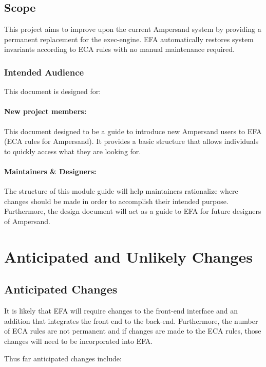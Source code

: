 \documentclass[12pt]{article}
\begin{document}
\subsection{Scope}
This project aims to improve upon the current Ampersand system by providing a 
permanent replacement for the exec-engine. EFA automatically restores system 
invariants according to ECA rules with no manual maintenance required.

\subsubsection{Intended Audience}
This document is designed for:
\paragraph{New project members:}
This document designed to be a guide to introduce new Ampersand users to EFA 
(ECA rules for Ampersand). It provides a basic structure that allows 
individuals to quickly access what they are looking for.
   
\paragraph{Maintainers \& Designers:} The structure of this module guide will 
help maintainers rationalize where changes should be made in order to 
accomplish their intended purpose. Furthermore, the design document will act as 
a guide to EFA for future designers of Ampersand.

\section{Anticipated and Unlikely Changes}
\subsection{Anticipated Changes}
It is likely that EFA will require changes to the front-end interface and an 
addition that integrates the front end to the back-end. Furthermore, the number 
of ECA rules are not permanent and if changes are made to the ECA rules, those 
changes will need to be incorporated into EFA. 

Thus far anticipated changes include:
\end{document}
